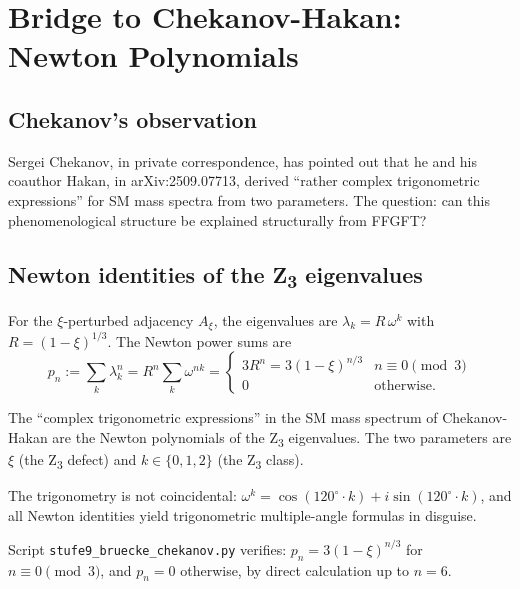 \section{Bridge to Chekanov-Hakan: Newton Polynomials}
\label{sec:chekanov}

\subsection{Chekanov's observation}

Sergei Chekanov, in private correspondence, has pointed out that he and his coauthor Hakan, in arXiv:2509.07713, derived ``rather complex trigonometric expressions'' for SM mass spectra from two parameters. The question: can this phenomenological structure be explained structurally from FFGFT?

\subsection[Newton identities of the Z3 eigenvalues]{Newton identities of the Z\textsubscript{3} eigenvalues}

For the \(\xi\)-perturbed adjacency \(A_\xi\), the eigenvalues are \(\lambda_k = R\,\omega^k\) with \(R = (1-\xi)^{1/3}\). The Newton power sums are
\begin{equation}
p_n := \sum_k \lambda_k^n = R^n \sum_k \omega^{nk} = \begin{cases} 3 R^n = 3 (1-\xi)^{n/3} & n \equiv 0 \pmod 3 \\ 0 & \text{otherwise.} \end{cases}
\end{equation}

\begin{keyresult}
The ``complex trigonometric expressions'' in the SM mass spectrum of Chekanov-Hakan are the Newton polynomials of the Z\textsubscript{3} eigenvalues. The two parameters are \(\xi\) (the Z\textsubscript{3} defect) and \(k \in \{0, 1, 2\}\) (the Z\textsubscript{3} class).
\end{keyresult}

The trigonometry is not coincidental: \(\omega^k = \cos(120^\circ \cdot k) + i \sin(120^\circ \cdot k)\), and all Newton identities yield trigonometric multiple-angle formulas in disguise.

Script \texttt{stufe9\_bruecke\_chekanov.py} verifies: \(p_n = 3(1-\xi)^{n/3}\) for \(n \equiv 0 \pmod 3\), and \(p_n = 0\) otherwise, by direct calculation up to \(n = 6\).

